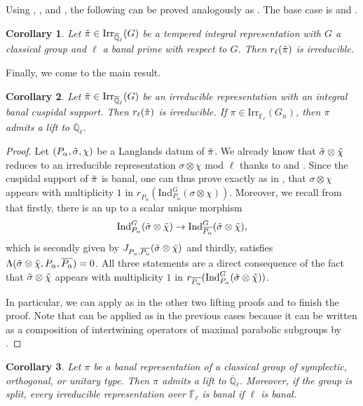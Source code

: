 \documentclass[10pt,a4paper]{article}
\newtheorem{corollary}{Corollary}[section]
\theoremstyle{remark}
\theoremstyle{definition}
\newcommand{\fl}{{\overline{\mathbb{F}}_\ell}}
\newcommand{\ql}{{\overline{\mathbb{Q}}_\ell}}
\newcommand{\id}{\mathrm{Ind}}
\newcommand{\ra}{\rightarrow}
\newcommand{\tpi}{\Tilde{\pi}}
\newcommand{\tsigma}{\Tilde{\sigma}}
\newcommand{\irr}{\mathrm{Irr}}
\newcommand{\rl}{r_\ell}
\newcommand{\tchi}{\Tilde{\chi}}
\begin{document}
Using , , and , the following can be proved analogously as .
The base case is  and . 
\begin{corollary}\label{C:liftGtemp}
    Let $\tpi\in\irr_\ql(G)$ be a tempered integral representation with $G$ a classical group and $\ell$ a banal prime with respect to $G$. Then $\rl(\tpi)$ is irreducible.
\end{corollary}
Finally, we come to the main result.
\begin{corollary}\label{C:lifting}
    Let $\tpi\in\irr_\ql(G)$ be an irreducible representation with an integral banal cuspidal support. Then $\rl(\tpi)$ is irreducible.
If $\pi\in\irr_\fl(G_n)$, then $\pi$ admits a lift to $\ql$.
\end{corollary}
\begin{proof}
    Let $(P_\alpha,\tsigma,\chi)$ be a Langlands datum of $\tpi$. We already know that $\tsigma\otimes\tchi$ reduces to an irreducible representation $\sigma\otimes\chi$ mod $\ell$ thanks to  and . Since the cuspidal support of $\tpi$ is banal, one can thus prove exactly as in \cite{Borel_Wallach_2000}, that $\sigma\otimes\chi$ appears with multiplicity $1$ in $r_{\overline{P_\alpha}}(\id_{P_\alpha}^G(\sigma\otimes \chi))$. 
    Moreover, we recall from \cite{Borel_Wallach_2000} that firstly, there is an up to a scalar unique morphism
    \[\id_{P_\alpha}^G(\tsigma\otimes \tchi)\ra \id_{\overline{P_\alpha}}^G(\tsigma\otimes \tchi),\] which is secondly given by $J_{P_\alpha,\overline{P_\alpha}}(\tsigma\otimes\tchi)$ and thirdly, satisfies $\Lambda(\tsigma\otimes\tchi,P_\alpha,\overline{P_\alpha})=0$. All three statements are a direct consequence of the fact that $\tsigma\otimes\tchi$ appears with multiplicity $1$ in $r_{\overline{P_\alpha}}(\id_{P_\alpha}^G(\tsigma\otimes \tchi))$. 
    
    In particular, we can apply as in the other two lifting proofs  and  to finish the proof. Note that  can be applied as in the previous cases because it can be written as a composition of intertwining operators of maximal parabolic subgroups by \cite[Proposition 7.8]{Dat05}.
\end{proof}
\begin{corollary}\label{C:main}
    Let $\pi$ be a banal representation of a classical group of symplectic, orthogonal, or unitary type. Then $\pi$ admits a lift to $\ql$. Moreover, if the group is split, every irreducible representation over $\fl$ is banal if $\ell$ is banal.
\end{corollary}
\end{document}

